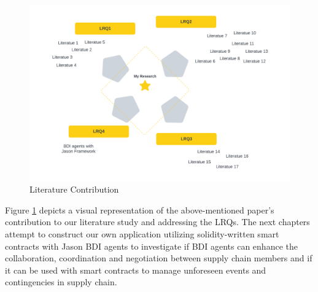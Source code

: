 \begin{figure}[h]
\centering
  \includegraphics[width=12cm]{includes/figures/related work.png} 
  \caption{Literature Contribution}
  \label{related work}
\end{figure}

Figure \ref{related work} depicts a visual representation of the above-mentioned paper's contribution to our literature study and addressing the LRQs. The next chapters attempt to construct our own application utilizing solidity-written smart contracts with Jason \ac{BDI} agents to investigate if \ac{BDI} agents can enhance the collaboration, coordination and negotiation between supply chain members and if it can be used with smart contracts to manage unforeseen events and contingencies in supply chain.